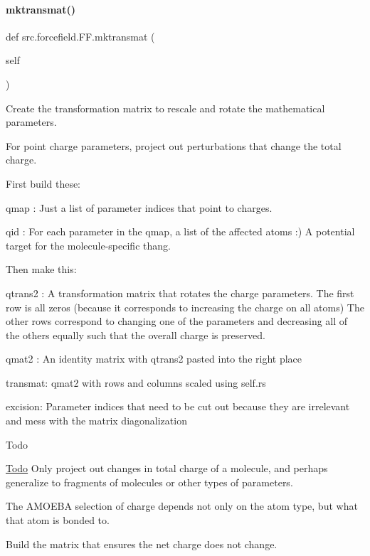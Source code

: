 \paragraph{\texorpdfstring{mktransmat()}{mktransmat()}}
{\footnotesize\ttfamily def src.\+forcefield.\+F\+F.\+mktransmat (\begin{DoxyParamCaption}\item[{}]{self }\end{DoxyParamCaption})}



Create the transformation matrix to rescale and rotate the mathematical parameters. 

For point charge parameters, project out perturbations that change the total charge.

First build these\+:

\textquotesingle{}qmap\textquotesingle{} \+: Just a list of parameter indices that point to charges.

\textquotesingle{}qid\textquotesingle{} \+: For each parameter in the qmap, a list of the affected atoms \+:) A potential target for the molecule-\/specific thang.

Then make this\+:

\textquotesingle{}qtrans2\textquotesingle{} \+: A transformation matrix that rotates the charge parameters. The first row is all zeros (because it corresponds to increasing the charge on all atoms) The other rows correspond to changing one of the parameters and decreasing all of the others equally such that the overall charge is preserved.

\textquotesingle{}qmat2\textquotesingle{} \+: An identity matrix with \textquotesingle{}qtrans2\textquotesingle{} pasted into the right place

\textquotesingle{}transmat\textquotesingle{}\+: \textquotesingle{}qmat2\textquotesingle{} with rows and columns scaled using self.\+rs

\textquotesingle{}excision\textquotesingle{}\+: Parameter indices that need to be \textquotesingle{}cut out\textquotesingle{} because they are irrelevant and mess with the matrix diagonalization

\begin{DoxyRefDesc}{Todo}
\item[\hyperlink{todo__todo000007}{Todo}]Only project out changes in total charge of a molecule, and perhaps generalize to fragments of molecules or other types of parameters. 

The A\+M\+O\+E\+BA selection of charge depends not only on the atom type, but what that atom is bonded to. \end{DoxyRefDesc}
Build the matrix that ensures the net charge does not change. 

